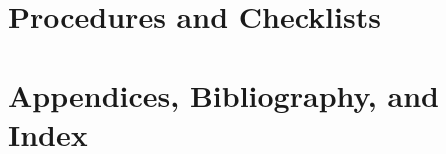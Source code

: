 \documentclass[letterpaper,10pt,titlepage]{custbook}
\begin{document}






\part{Procedures and Checklists}



\part{Appendices, Bibliography, and Index}

\appendix


%

%

%

%

%
\cleardoublepage
{}

%
\cleardoublepage
{}
\printindex
%
\end{document}
